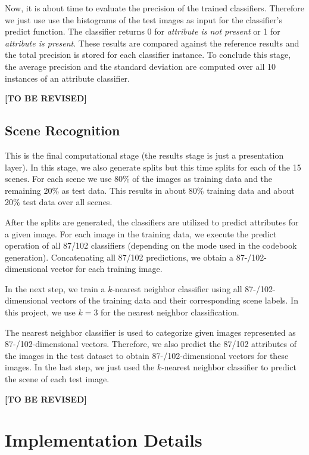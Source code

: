\documentclass{vldb}
\newcommand{\tbr}{{\color{red}\textbf{[TO BE REVISED]}}}
\begin{document}
Now, it is about time to evaluate the precision of the trained classifiers.
Therefore we just use use the histograms of the test images as input for the
classifier's predict function. The classifier returns 0 for \emph{attribute is
not present} or 1 for \emph{attribute is present}. These results are compared
against the reference results and the total precision is stored for each
classifier instance. To conclude this stage, the average precision and the
standard deviation are computed over all 10 instances of an attribute classifier.

\tbr

\subsection{Scene Recognition}
\label{subsec:scene-recognition}

This is the final computational stage (the results stage is just a presentation
layer). In this stage, we also generate splits but this time splits for each of
the 15 scenes. For each scene we use 80\% of the images as training data and the
remaining 20\% as test data. This results in about 80\% training data and about
20\% test data over all scenes.

After the splits are generated, the classifiers are utilized to predict attributes
for a given image. For each image in the training data, we execute the predict
operation of all 87/102 classifiers (depending on the mode used in the codebook
generation). Concatenating all 87/102 predictions, we obtain a 87-/102-dimensional
vector for each training image.

In the next step, we train a $k$-nearest neighbor classifier using all
87-/102-dimensional vectors of the training data and their corresponding scene
labels. In this project, we use $k = 3$ for the nearest neighbor classification.

The nearest neighbor classifier is used to categorize given images represented
as 87-/102-dimensional vectors. Therefore, we also predict the 87/102 attributes
of the images in the test dataset to obtain 87-/102-dimensional vectors for
these images. In the last step, we just used the $k$-nearest neighbor classifier
to predict the scene of each test image.

\tbr

\section{Implementation Details}
\label{sec:implementation-details}
\end{document}
